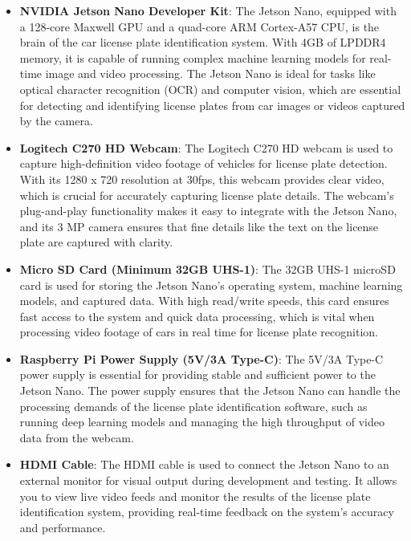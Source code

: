 \begin{itemize}[left=0pt]
	\item \textbf{NVIDIA Jetson Nano Developer Kit}: The Jetson Nano, equipped with a 128-core Maxwell GPU and a quad-core ARM Cortex-A57 CPU, is the brain of the car license plate identification system. With 4GB of LPDDR4 memory, it is capable of running complex machine learning models for real-time image and video processing. The Jetson Nano is ideal for tasks like optical character recognition (OCR) and computer vision, which are essential for detecting and identifying license plates from car images or videos captured by the camera. \cite{SED:2025}
	
	\item \textbf{Logitech C270 HD Webcam}: The Logitech C270 HD webcam is used to capture high-definition video footage of vehicles for license plate detection. With its 1280 x 720 resolution at 30fps, this webcam provides clear video, which is crucial for accurately capturing license plate details. The webcam’s plug-and-play functionality makes it easy to integrate with the Jetson Nano, and its 3 MP camera ensures that fine details like the text on the license plate are captured with clarity. \cite{CLB:2025}
	
	\item \textbf{Micro SD Card (Minimum 32GB UHS-1)}: The 32GB UHS-1 microSD card is used for storing the Jetson Nano’s operating system, machine learning models, and captured data. With high read/write speeds, this card ensures fast access to the system and quick data processing, which is vital when processing video footage of cars in real time for license plate recognition. \cite{ECK:2025}
	
	\item \textbf{Raspberry Pi Power Supply (5V/3A Type-C)}: The 5V/3A Type-C power supply is essential for providing stable and sufficient power to the Jetson Nano. The power supply ensures that the Jetson Nano can handle the processing demands of the license plate identification software, such as running deep learning models and managing the high throughput of video data from the webcam. \cite{eBay:2025}
	
	\item \textbf{HDMI Cable}: The HDMI cable is used to connect the Jetson Nano to an external monitor for visual output during development and testing. It allows you to view live video feeds and monitor the results of the license plate identification system, providing real-time feedback on the system's accuracy and performance. \cite{AMZ:2025}
	

\end{itemize}
